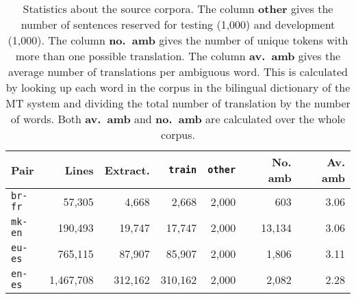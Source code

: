 \documentclass[11pt]{article}
\begin{document}
\begin{table*}
\begin{center}
 \begin{tabular}{|l|r|r||r|r|r|r|}
    \hline  
    {\bf Pair}      & {\bf Lines} & {\bf Extract.} & \texttt{train} & \texttt{other} & {\bf No. amb} & {\bf Av. amb} \\ 
    \hline  
     \texttt{br-fr} & 57,305  & 4,668 & 2,668 & 2,000  & 603  & 3.06 \\
    \hline  
     \texttt{mk-en} & 190,493  & 19,747  & 17,747  & 2,000 & 13,134  & 3.06  \\
    \hline
     \texttt{eu-es} & 765,115  & 87,907  & 85,907  & 2,000 & 1,806  & 3.11 \\
    \hline
     \texttt{en-es} & 1,467,708 & 312,162 & 310,162 & 2,000 & 2,082  & 2.28 \\
    \hline  
 \end{tabular}
 \caption{Statistics about the source corpora. The column {\bf other}
   gives the number of sentences reserved for testing (1,000) and
   development (1,000). The column {\bf no.\ amb} gives the number of
   unique tokens with more than one possible translation. The column
   {\bf av.\ amb} gives the average number of translations per ambiguous
   word. This is calculated by looking up each word in the corpus in
   the bilingual dictionary of the MT system and dividing the total
   number of translation by the number of words. Both {\bf av.\ amb}
   and {\bf no.\ amb} are calculated over the whole corpus.}
 \label{table:input-corp}
\end{center}
\end{table*}

\end{document}
